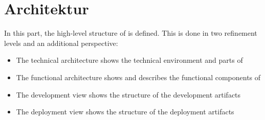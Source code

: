 \part{Architektur}
\label{sec:Architeture}

In this part, the high-level structure of \LibName{} is defined. This is done in two refinement levels and an additional perspective:
\begin{itemize}
	\item The technical architecture shows the technical environment and parts of \LibName{}
	\item The functional architecture shows and describes the functional components of \LibName{}
	\item The development view shows the structure of the \LibName{} development artifacts
	\item The deployment view shows the structure of the \LibName{} deployment artifacts
\end{itemize}




%

%
%
